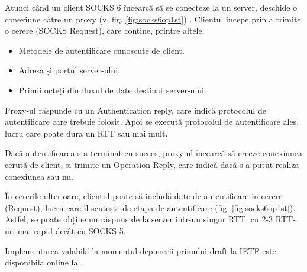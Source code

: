 Atunci când un client SOCKS 6 încearcă să se conecteze la un server, deschide o conexiune către un proxy (v. fig. \ref{fig:socks6op1st}) .
Clientul începe prin a trimite o cerere (SOCKS Request), care conține, printre altele:
\begin{itemize}
	\item Metodele de autentificare cunoscute de client.
	\item Adresa și portul server-ului.
	\item Primii octeți din fluxul de date destinat server-ului.
\end{itemize}

Proxy-ul răspunde cu un Authentication reply, care indică protocolul de autentificare care trebuie folosit.
Apoi se execută protocolul de autentificare ales, lucru care poate dura un RTT sau mai mult.

Dacă autentificarea s-a terminat cu succes, proxy-ul încearcă să creeze conexiunea cerută de client, si trimite un Operation Reply, care indică dacă s-a putut realiza conexiunea sau nu.

În cererile ulterioare, clientul poate să includă date de autentificare in cerere (Request), lucru care îl scutește de etapa de autentificare (fig. \ref{fig:socks6op1st}).
Astfel, se poate obține un răspuns de la server intr-un singur RTT, cu 2-3 RTT-uri mai rapid decât cu SOCKS 5.


Implementarea valabilă la momentul depunerii primului draft la IETF
este disponibilă online la \cite{socks105}. 

